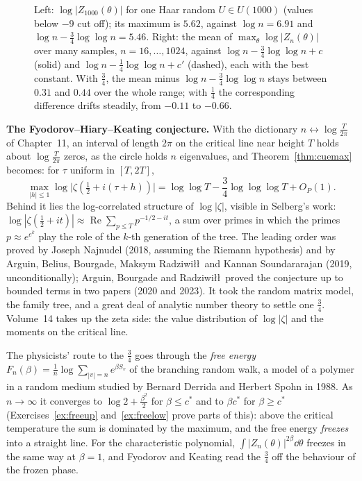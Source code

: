 \begin{figure}[ht]
\centering
{}
\caption{Left: $\log|Z_{1000}(\theta)|$ for one Haar random $U\in U(1000)$ (values below $-9$ cut off); its maximum is $5.62$, against $\log n=6.91$ and $\log n-\frac34\log\log n=5.46$. Right: the mean of $\max_\theta\log|Z_n(\theta)|$ over many
samples, $n=16,\dots,1024$, against $\log n-\frac34\log\log n+c$ (solid) and $\log n-\frac14\log\log n+c'$ (dashed), each with the best constant. With $\frac34$, the mean minus $\log n-\frac34\log\log n$ stays between $0.31$ and $0.44$ over the whole range; with $\frac14$ the corresponding difference drifts steadily, from $-0.11$ to $-0.66$.}
\label{fig:maxima}
\end{figure}

\begin{beauty}
\textbf{The Fyodorov--Hiary--Keating conjecture.} With the dictionary $n\leftrightarrow\log\frac T{2\pi}$ of Chapter~11, an interval of length $2\pi$ on the critical line near height $T$ holds about $\log\frac T{2\pi}$ zeros, as the circle holds
$n$ eigenvalues, and Theorem~\ref{thm:cuemax} becomes: for $\tau$ uniform in $[T,2T]$,
\[
\max_{|h|\le1}\log\bigl|\zeta(\tfrac12+i(\tau+h))\bigr|=\log\log T-\frac34\log\log\log T+O_P(1).
\]
Behind it lies the log-correlated structure of $\log|\zeta|$, visible in Selberg's work: $\log|\zeta(\frac12+it)|\approx\operatorname{Re}\sum_{p\le T}p^{-1/2-it}$, a sum over primes in which the primes $p\approx e^{e^k}$ play the role of the $k$-th
generation of the tree. The leading order was proved by Joseph Najnudel (2018, assuming the Riemann hypothesis) and by Arguin, Belius, Bourgade, Maksym Radziwi\l\l\ and Kannan Soundararajan (2019, unconditionally); Arguin,
Bourgade and Radziwi\l\l\ proved the conjecture up to bounded terms in two papers (2020 and 2023). It took the random matrix model, the family tree, and a great deal of analytic number theory to settle one $\frac34$. Volume~14 takes up the zeta side: the value distribution of $\log|\zeta|$ and the moments on the critical line.
\end{beauty}

\begin{remark}[freezing]
The physicists' route to the $\frac34$ goes through the \emph{free energy} $F_n(\beta)=\frac1n\log\sum_{|v|=n}e^{\beta S_v}$ of the branching random walk, a model of a polymer in a random medium studied by Bernard Derrida and Herbert
Spohn in 1988. As $n\to\infty$ it converges to $\log2+\frac{\beta^2}2$ for $\beta\le c^*$ and to $\beta c^*$ for $\beta\ge c^*$ (Exercises~\ref{ex:freeup} and~\ref{ex:freelow} prove parts of this): above the critical temperature the sum is dominated by
the maximum, and the free energy \emph{freezes} into a straight line. For the characteristic polynomial, $\int|Z_n(\theta)|^{2\beta}\dd\theta$ freezes in the same way at $\beta=1$, and Fyodorov and Keating read the $\frac34$ off the
behaviour of the frozen phase.
\end{remark}

